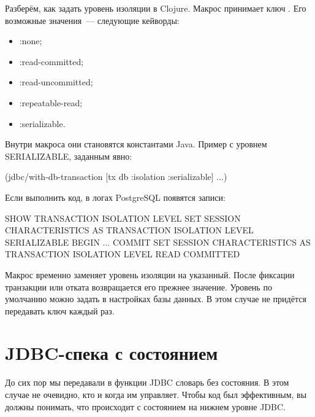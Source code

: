 Разберём, как задать уровень изоляции в Clojure. Макрос  принимает ключ . Его возможные значения~--- следующие кейворды:

\begin{itemize}

\item
  :none;

\item
  :read-committed;

\item
  :read-uncommitted;

\item
  :repeatable-read;

\item
  :serializable.

\end{itemize}

Внутри макроса они становятся константами Java. Пример с уровнем SERIALIZABLE, заданным явно:

\begin{english}
  \begin{clojure}
(jdbc/with-db-transaction
  [tx db {:isolation :serializable}]
  ...)
  \end{clojure}
\end{english}

Если выполнить код, в логах PostgreSQL появятся записи:

\begin{english}
  \begin{sql}
SHOW TRANSACTION ISOLATION LEVEL
SET SESSION CHARACTERISTICS
  AS TRANSACTION ISOLATION LEVEL SERIALIZABLE
BEGIN
...
COMMIT
SET SESSION CHARACTERISTICS
  AS TRANSACTION ISOLATION LEVEL READ COMMITTED
  \end{sql}
\end{english}

Макрос временно заменяет уровень изоляции на указанный. После фиксации транзакции или отката возвращается его прежнее значение. Уровень по умолчанию можно задать в настройках базы данных. В этом случае не придётся передавать ключ  каждый раз.

\section{JDBC-спека с состоянием}

До сих пор мы передавали в функции JDBC словарь без состояния. В этом случае не очевидно, кто и когда им управляет. Чтобы код был эффективным, вы должны понимать, что происходит с состоянием на нижнем уровне JDBC.

